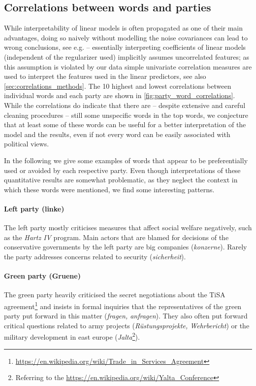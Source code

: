 \documentclass[runningheads,a4paper]{llncs}
\begin{document}
\subsection{Correlations between words and parties}\label{sec:word_party_correlations}

While interpretability of linear models is often propagated as one of their main advantages, doing so naively without modelling the noise covariances can lead to wrong conclusions, see e.g. \cite{Zien2009, Haufe2013} -- essentially interpreting coefficients of linear models (independent of the regularizer used) implicitly assumes uncorrelated features; as this assumption is violated by our data simple univariate correlation measures are used to interpret the features used in the linear predictors, see also \autoref{sec:correlations_methods}. The 10 highest and lowest correlations between individual words and each party are shown in \autoref{fig:party_word_correlations}. While the correlations do indicate that there are -- despite extensive and careful cleaning procedures -- still some unspecific words in the top words, we conjecture that at least some of these words can be useful for a better interpretation of the model and the results, even if not every word can be easily associated with political views. 

In the following we give some examples of words that appear to be preferentially used or avoided by each respective party. Even though interpretations of these quantitative results are somewhat problematic, as they neglect the context in which these words were mentioned, we find some interesting patterns. 

\paragraph{\bf Left party (linke)}
The left party mostly criticises measures that affect social welfare negatively, such as the {\em Hartz IV} program. Main actors that are blamed for decisions of the conservative governments by the left party are big companies ({\em konzerne}). Rarely the party addresses concerns related to security ({\em sicherheit}). 

\paragraph{\bf Green party (Gruene)}
The green party heavily criticised the secret negotiations about the TiSA agreement\footnote{\url{https://en.wikipedia.org/wiki/Trade_in_Services_Agreement}} and insists in formal inquiries that the representatives of the green party put forward in this matter ({\em fragen, anfragen}). They also often put forward critical questions related to army projects ({\em R\"ustungsprojekte, Wehrbericht}) or the military development in east europe ({\em  Jalta}\footnote{Referring to the \url{https://en.wikipedia.org/wiki/Yalta_Conference}}).
\end{document}
